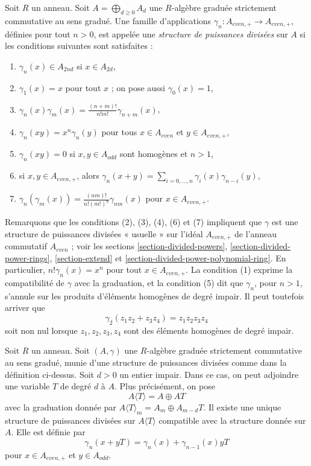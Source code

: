 \begin{definition}
\label{definition-divided-powers-graded}
Soit $R$ un anneau. Soit $A = \bigoplus_{d \geq 0} A_d$ une $R$-algèbre
graduée strictement commutative au sens gradué. Une famille d'applications
$\gamma_n : A_{even, +} \to A_{even, +}$, définies pour tout $n > 0$, est
appelée une {\it structure de puissances divisées} sur $A$ si les conditions
suivantes sont satisfaites :
\begin{enumerate}
\item $\gamma_n(x) \in A_{2nd}$ si $x \in A_{2d}$,
\item $\gamma_1(x) = x$ pour tout $x$ ; on pose aussi $\gamma_0(x) = 1$,
\item $\gamma_n(x)\gamma_m(x) = \frac{(n + m)!}{n! m!} \gamma_{n + m}(x)$,
\item $\gamma_n(xy) = x^n \gamma_n(y)$ pour tous $x \in A_{even}$ et
$y \in A_{even, +}$,
\item $\gamma_n(xy) = 0$ si $x, y \in A_{odd}$ sont homogènes et $n > 1$,
\item si $x, y \in A_{even, +}$, alors
$\gamma_n(x + y) = \sum_{i = 0, \ldots, n} \gamma_i(x)\gamma_{n - i}(y)$,
\item $\gamma_n(\gamma_m(x)) =
\frac{(nm)!}{n! (m!)^n} \gamma_{nm}(x)$ pour $x \in A_{even, +}$.
\end{enumerate}
\end{definition}

\noindent
Remarquons que les conditions (2), (3), (4), (6) et (7) impliquent que
$\gamma$ est une structure de puissances divisées « usuelle » sur l'idéal
$A_{even, +}$ de l'anneau commutatif $A_{even}$ ; voir les
sections \ref{section-divided-powers},
\ref{section-divided-power-rings},
\ref{section-extend} et
\ref{section-divided-power-polynomial-ring}.
En particulier, $n! \gamma_n(x) = x^n$ pour tout $x \in A_{even, +}$.
La condition (1) exprime la compatibilité de $\gamma$ avec la graduation, et
la condition (5) dit que $\gamma_n$, pour $n > 1$, s'annule sur les produits
d'éléments homogènes de degré impair. Il peut toutefois arriver que
$$
\gamma_2(z_1 z_2 + z_3 z_4) = z_1z_2z_3z_4
$$
soit non nul lorsque $z_1, z_2, z_3, z_4$ sont des éléments homogènes de
degré impair.

\begin{example}
\label{example-adjoining-odd}
Soit $R$ un anneau. Soit $(A, \gamma)$ une $R$-algèbre graduée strictement
commutative au sens gradué, munie d'une structure de puissances divisées
comme dans la définition ci-dessus. Soit $d > 0$ un entier impair. Dans ce
cas, on peut adjoindre une variable $T$ de degré $d$ à $A$. Plus précisément,
on pose
$$
A\langle T \rangle = A \oplus AT
$$
avec la graduation donnée par
$A\langle T \rangle_m = A_m \oplus A_{m - d}T$. Il existe une unique
structure de puissances divisées sur $A\langle T \rangle$ compatible avec la
structure donnée sur $A$. Elle est définie par
$$
\gamma_n(x + yT) = \gamma_n(x) + \gamma_{n - 1}(x)yT
$$
pour $x \in A_{even, +}$ et $y \in A_{odd}$.
\end{example}

